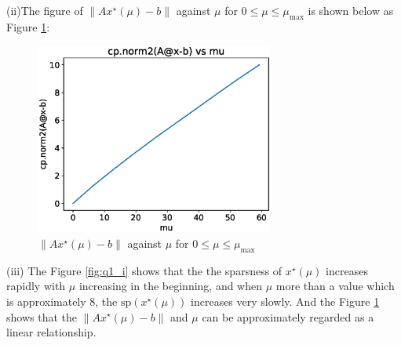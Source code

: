 \documentclass[a4paper,11pt,reqno]{amsart}
\begin{document}
(ii)The figure of $\left\lVert Ax^{\star}(\mu) - b\right\rVert$ against $\mu$ for $0 \leq \mu \leq \mu_{\mathrm{max}}$ is shown below as Figure \ref{fig:q1_ii}:
\begin{figure}[H]
    \centering
    \includegraphics[width=0.7\textwidth]{figures/q1_ii.eps}
    \caption{$\left\lVert Ax^{\star}(\mu) - b\right\rVert$ against $\mu$ for $0 \leq \mu \leq \mu_{\mathrm{max}}$}
    \label{fig:q1_ii}
\end{figure}

(iii)
The Figure \ref{fig:q1_i} shows that the the sparsness of $x^{\star}(\mu)$ increases rapidly with $\mu$ increasing in the beginning, and when $\mu$ more than a value which is approximately 8, the $\mathrm{sp}(x^{\star}(\mu))$ increases very slowly.
And the Figure \ref{fig:q1_ii} shows that the $\left\lVert Ax^{\star}(\mu) - b\right\rVert$ and $\mu$ can be approximately regarded as a linear relationship.

\end{document}
